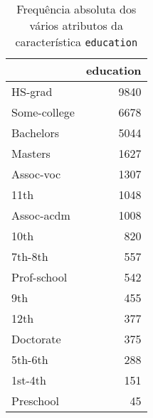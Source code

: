 \begin{table}
\centering
\caption{Frequência absoluta dos vários atributos da característica \texttt{education}}
\begin{tabular}{lr}
\toprule
{} &  education \\
\midrule
 HS-grad      &       9840 \\
 Some-college &       6678 \\
 Bachelors    &       5044 \\
 Masters      &       1627 \\
 Assoc-voc    &       1307 \\
 11th         &       1048 \\
 Assoc-acdm   &       1008 \\
 10th         &        820 \\
 7th-8th      &        557 \\
 Prof-school  &        542 \\
 9th          &        455 \\
 12th         &        377 \\
 Doctorate    &        375 \\
 5th-6th      &        288 \\
 1st-4th      &        151 \\
 Preschool    &         45 \\
\bottomrule
\end{tabular}
\end{table}
